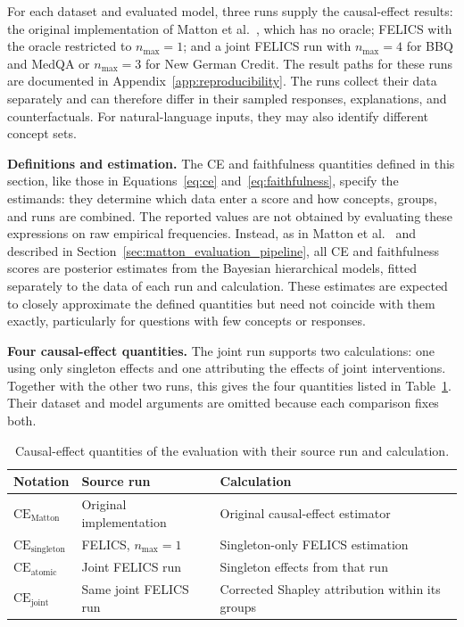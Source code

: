 For each dataset and evaluated model, three runs supply the causal-effect results: the original implementation of Matton et al.~\cite{mattonWalkTalkMeasuring2024}, which has no oracle; FELICS with the oracle restricted to $n_{\max}=1$; and a joint FELICS run with $n_{\max}=4$ for BBQ and MedQA or $n_{\max}=3$ for New German Credit. The result paths for these runs are documented in Appendix~\ref{app:reproducibility}. The runs collect their data separately and can therefore differ in their sampled responses, explanations, and counterfactuals. For natural-language inputs, they may also identify different concept sets.

\noindent\textbf{Definitions and estimation.} The CE and faithfulness quantities defined in this section, like those in Equations~\ref{eq:ce} and~\ref{eq:faithfulness}, specify the estimands: they determine which data enter a score and how concepts, groups, and runs are combined. The reported values are not obtained by evaluating these expressions on raw empirical frequencies. Instead, as in Matton et al.~\cite{mattonWalkTalkMeasuring2024} and described in Section~\ref{sec:matton_evaluation_pipeline}, all CE and faithfulness scores are posterior estimates from the Bayesian hierarchical models, fitted separately to the data of each run and calculation. These estimates are expected to closely approximate the defined quantities but need not coincide with them exactly, particularly for questions with few concepts or responses.

\noindent\textbf{Four causal-effect quantities.} The joint run supports two calculations: one using only singleton effects and one attributing the effects of joint interventions. Together with the other two runs, this gives the four quantities listed in Table~\ref{tab:ce-quantities}. Their dataset and model arguments are omitted because each comparison fixes both.

\begin{table}[htb]
	\centering
	\caption[Causal-effect quantities of the evaluation]{Causal-effect quantities of the evaluation with their source run and calculation.}
	\label{tab:ce-quantities}
	\small
	\begin{tabular}{@{}p{}p{}p{}@{}}
		\hline
		\textbf{Notation}                  & \textbf{Source run}     & \textbf{Calculation}                            \\
		\hline
		$\mathrm{CE}_{\mathrm{Matton}}$    & Original implementation & Original causal-effect estimator                \\
		$\mathrm{CE}_{\mathrm{singleton}}$ & FELICS, $n_{\max}=1$    & Singleton-only FELICS estimation                \\
		$\mathrm{CE}_{\mathrm{atomic}}$    & Joint FELICS run        & Singleton effects from that run                 \\
		$\mathrm{CE}_{\mathrm{joint}}$     & Same joint FELICS run   & Corrected Shapley attribution within its groups \\
		\hline
	\end{tabular}
\end{table}

